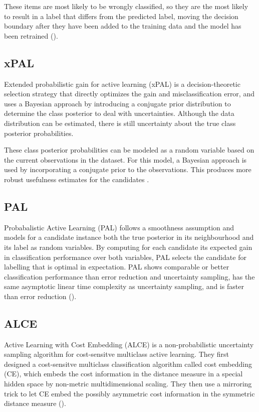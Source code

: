 These items are most likely to be wrongly classified, so they are the most likely to result in a label that differs from the predicted label, moving the decision boundary after they have been added to the training data and the model has been retrained (\cite{munro2021human}).

\subsection{xPAL}
Extended probabilistic gain for active learning (xPAL) is a decision-theoretic selection strategy that directly optimizes the gain and misclassification error, and uses a Bayesian approach by introducing a conjugate prior distribution to determine the class posterior to deal with uncertainties. Although the data distribution can be estimated, there is still uncertainty about the true class posterior probabilities. 

These class posterior probabilities can be modeled as a random variable based on the current observations in the dataset. For this model, a Bayesian approach is used by incorporating a conjugate prior to the observations. This produces more robust usefulness estimates for the candidates \cite{kottke2021toward}.

\subsection{PAL}
Probabalistic Active Learning (PAL) follows a smoothness assumption and models for a candidate instance both the true posterior in its neighbourhood and its label as random variables. By computing for each candidate its expected gain in classification performance over both variables, PAL selects the candidate for labelling that is optimal in expectation. PAL shows comparable or better classification performance than error reduction and uncertainty sampling, has the same asymptotic linear time complexity as uncertainty sampling, and is faster than error reduction (\cite{kottke2014pal}).

\subsection{ALCE}
Active Learning with Cost Embedding (ALCE) is a non-probabilistic uncertainty sampling algorithm for cost-sensitve multiclass active learning. They first designed a cost-sensitve multiclass classification algorithm called cost embedding (CE), which embeds the cost information in the distance measure in a special hidden space by non-metric multidimensional scaling. They then use a mirroring trick to let CE embed the possibly asymmetric cost information in the symmetric distance measure (\cite{huang2016alce}).

